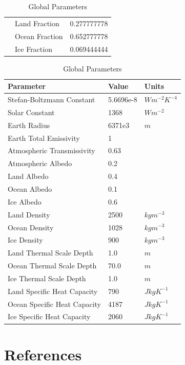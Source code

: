 \documentclass[12pt]{article}
\begin{document}
\begin{table}[H]
{\begin{tabular}{lll}
     & Land Fraction & 0.277777778 \\
     & Ocean Fraction & 0.652777778 \\ 
     & Ice Fraction & 0.069444444\\
    \end{tabular}
    \label{tab:zoneparams}
    }
    \hfill
    \parbox{.45\linewidth}{
    \captionsetup{singlelinecheck = false, justification=justified}
    \caption{Global Parameters}
    \begin{tabular}{lll}
    \hline
    Parameter & Value & Units \\
    \hline
    Stefan-Boltzmann Constant & 5.6696e-8 & $Wm^{-2}K^{-4}$ \\
    Solar Constant & 1368 & $Wm^{-2}$ \\
    Earth Radius & 6371e3 & $m$ \\
    Earth Total Emissivity & 1  \\
    Atmospheric Transmissivity & 0.63  \\
    Atmospheric Albedo & 0.2 \\
    Land Albedo & 0.4 \\
    Ocean Albedo & 0.1\\
    Ice Albedo & 0.6 \\
    Land Density & 2500 & $kgm^{-3}$\\
    Ocean Density & 1028 & $kgm^{-3}$\\
    Ice Density & 900 & $kgm^{-3}$\\
    Land Thermal Scale Depth & 1.0 & $m$ \\
    Ocean Thermal Scale Depth & 70.0 & $m$ \\
    Ice Thermal Scale Depth & 1.0 & $m$ \\
    Land Specific Heat Capacity & 790 & $JkgK^{-1}$\\
    Ocean Specific Heat Capacity & 4187 & $JkgK^{-1}$\\
    Ice Specific Heat Capacity & 2060 & $JkgK^{-1}$\\
    \end{tabular}
    \label{tab:globalparams}}
\end{table}
\FloatBarrier

\newpage
\section{References}
\printbibliography
\end{document}
